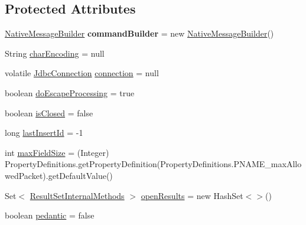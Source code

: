 \subsection*{Protected Attributes}
\begin{DoxyCompactItemize}
\item 
\mbox{\label{classcom_1_1mysql_1_1cj_1_1jdbc_1_1_statement_impl_a22d76e354be8de4952f86504a3433251}} 
\mbox{\hyperlink{classcom_1_1mysql_1_1cj_1_1protocol_1_1a_1_1_native_message_builder}{Native\+Message\+Builder}} {\bfseries command\+Builder} = new \mbox{\hyperlink{classcom_1_1mysql_1_1cj_1_1protocol_1_1a_1_1_native_message_builder}{Native\+Message\+Builder}}()
\item 
String \mbox{\hyperlink{classcom_1_1mysql_1_1cj_1_1jdbc_1_1_statement_impl_a013d9c1b743d83cb092f7175327a8455}{char\+Encoding}} = null
\item 
volatile \mbox{\hyperlink{interfacecom_1_1mysql_1_1cj_1_1jdbc_1_1_jdbc_connection}{Jdbc\+Connection}} \mbox{\hyperlink{classcom_1_1mysql_1_1cj_1_1jdbc_1_1_statement_impl_a0d65d87b997eec0472cc8f07f376cfe0}{connection}} = null
\item 
boolean \mbox{\hyperlink{classcom_1_1mysql_1_1cj_1_1jdbc_1_1_statement_impl_af7455e23bee0b1db4c8b8aa1a94f5412}{do\+Escape\+Processing}} = true
\item 
boolean \mbox{\hyperlink{classcom_1_1mysql_1_1cj_1_1jdbc_1_1_statement_impl_a5bdc6952f3179144fc55b513bed5a5d7}{is\+Closed}} = false
\item 
long \mbox{\hyperlink{classcom_1_1mysql_1_1cj_1_1jdbc_1_1_statement_impl_a68a8e8c2a5616f548cc9152817fb0459}{last\+Insert\+Id}} = -\/1
\item 
int \mbox{\hyperlink{classcom_1_1mysql_1_1cj_1_1jdbc_1_1_statement_impl_a355103d25d6487623132cf8d0c64c9ab}{max\+Field\+Size}} = (Integer) Property\+Definitions.\+get\+Property\+Definition(Property\+Definitions.\+P\+N\+A\+M\+E\+\_\+max\+Allowed\+Packet).get\+Default\+Value()
\item 
Set$<$ \mbox{\hyperlink{interfacecom_1_1mysql_1_1cj_1_1jdbc_1_1result_1_1_result_set_internal_methods}{Result\+Set\+Internal\+Methods}} $>$ \mbox{\hyperlink{classcom_1_1mysql_1_1cj_1_1jdbc_1_1_statement_impl_a812055d2262412bf71c9553cb0e7640c}{open\+Results}} = new Hash\+Set$<$$>$()
\item 
boolean \mbox{\hyperlink{classcom_1_1mysql_1_1cj_1_1jdbc_1_1_statement_impl_a0e2a7c6a67916ad9df5f99e913c85daf}{pedantic}} = false
$$
\end{DoxyCompactItemize}

